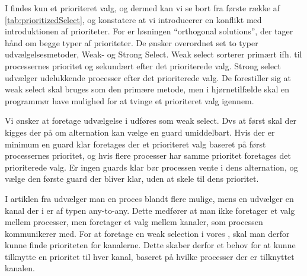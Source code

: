 I \pycsp findes kun et prioriteret valg, og dermed kan vi se bort fra første række af \cref{tab:prioritizedSelect}, og konstatere at vi introducerer  en konflikt med introduktionen af prioriteter. For \citeauthor{Burns1990} er løsningen ``orthogonal solutions'', der  tager hånd om begge typer af prioriteter. De ønsker overordnet set to typer udvælgelsesmetoder, Weak- og Strong Select. Weak select sorterer primært ifh. til processernes prioritet og sekundært efter det prioriterede valg. Strong select udvælger udelukkende processer efter det prioriterede valg. De forestiller sig at weak select skal bruges som den primære metode, men i hjørnetilfælde skal en programmør have mulighed for at tvinge et prioriteret valg igennem.

Vi ønsker at foretage udvælgelse i  udføres som weak select. Dvs at først skal der kigges der på om alternation kan vælge en guard umiddelbart. Hvis der er minimum en guard klar foretages der et prioriteret valg baseret på først processernes prioritet, og hvis flere processer har samme prioritet  foretages det prioriterede valg. Er ingen guards klar bør processen vente i dens alternation, og vælge den første guard der bliver klar, uden at skele til dens prioritet.

I artiklen fra \citeauthor{Burns1990} udvælger man en proces blandt flere mulige, mens en  udvælger en kanal der i \pycsp er af typen any-to-any. Dette medfører at man ikke  foretager et valg mellem processer, men foretager et valg mellem kanaler, som processen kommunikerer med. For at foretage en weak selection i vores , skal man derfor kunne finde prioriteten for kanalerne. Dette skaber derfor et behov for at kunne tilknytte en prioritet til hver kanal, baseret på hvilke processer der er tilknyttet kanalen. 
\label{misc:kanal-prioritet}



